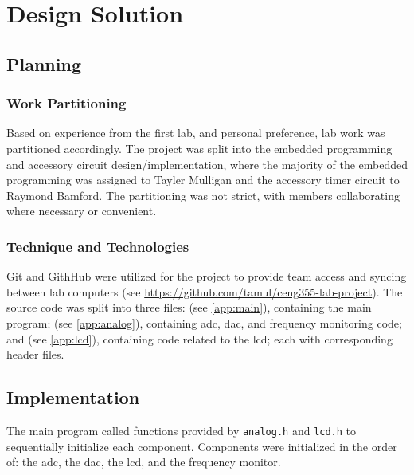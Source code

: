 
\section{Design Solution}
\subsection{Planning}
\subsubsection{Work Partitioning}
Based on experience from the first lab, and personal preference, lab
work was partitioned accordingly. The project was split into the
embedded programming and accessory circuit design/implementation, where
the majority of the embedded programming was assigned to Tayler Mulligan
and the accessory timer circuit to Raymond Bamford. The partitioning was
not strict, with members collaborating where necessary or convenient.

\subsubsection{Technique and Technologies}
Git and GithHub were utilized for the project to provide team access and
syncing between lab computers (see
\url{https://github.com/tamul/ceng355-lab-project}). The source code was
split into three files:  (see \ref{app:main}), containing the main program;
 (see \ref{app:analog}), containing \gls{adc},
\gls{dac}, and frequency monitoring
code; and  (see \ref{app:lcd}), containing code related
to the \gls{lcd}; each
with corresponding header files.

\subsection{Implementation}
The main program called functions provided by \lstinline{analog.h} and
\lstinline{lcd.h} to sequentially initialize each component. Components
were initialized in the order of: the \gls{adc}, the \gls{dac}, the
\gls{lcd}, and the frequency monitor. 


